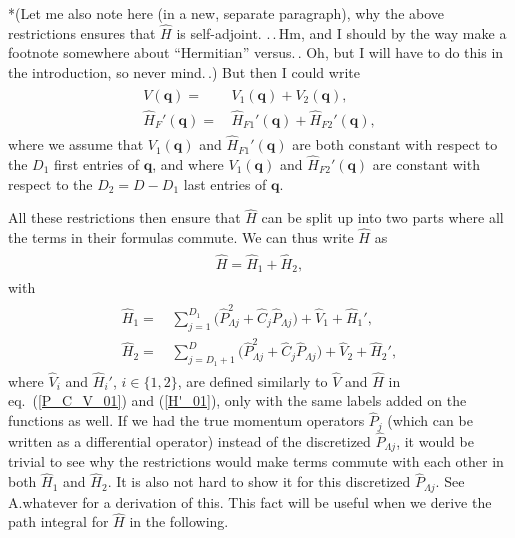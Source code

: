 \documentclass{report}
\begin{document}
*(Let me also note here (in a new, separate paragraph), why the above restrictions ensures that $\hat H$ is self-adjoint. .\,.\,Hm, and I should by the way make a footnote somewhere about ``Hermitian'' versus.\,. Oh, but I will have to do this in the introduction, so never mind.\,.)
But then I could write
\begin{align}
\begin{aligned}
	V(\boldsymbol{q}) =&\, V_1(\boldsymbol{q}) + V_2(\boldsymbol{q}), \\
	\hat H_F'(\boldsymbol{q}) =&\, \hat H_{F1}'(\boldsymbol{q}) + \hat H_{F2}'(\boldsymbol{q}),
\end{aligned}
\end{align}
where we assume that $V_1(\boldsymbol{q})$ and $\hat H_{F1}'(\boldsymbol{q})$ are both constant with respect to the $D_1$ first entries of $\boldsymbol{q}$, and where $V_1(\boldsymbol{q})$ and $\hat H_{F2}'(\boldsymbol{q})$ are constant with respect to the $D_2 = D - D_1$ last entries of $\boldsymbol{q}$. 

All these restrictions then ensure that $\hat H$ can be split up into two parts where all the terms in their formulas commute. We can thus write $\hat H$ as
\begin{align}
\begin{aligned}
	\hat H  = \hat H_1 + \hat H_2,
\end{aligned}
\end{align}
with
\begin{align}
\begin{aligned}
	\hat H_1  =&\,
		\sum_{j=1}^{D_1} \big( \hat P_{\Lambda j}^2 + \hat C_j \hat P_{\Lambda j} \big) + 
		\hat V_1 +
		\hat H_1', \\
	\hat H_2  =&\,
		\sum_{j=D_1 + 1}^{D} \big( \hat P_{\Lambda j}^2 + \hat C_j \hat P_{\Lambda j} \big) + 
		\hat V_2 +
		\hat H_2', 
	\label{H1_H2_01}
\end{aligned}
\end{align}
where $\hat V_i$ and $\hat H_i'$, $i\in\{1,2\}$, are %
defined similarly to $\hat V$ and $\hat H$ in eq.\ (\ref{P_C_V_01}) and (\ref{H'_01}), only with the same labels added on the functions as well. If we had the true momentum operators $\hat P_j$ (which can be written as a differential operator) instead of the discretized $\hat P_{\Lambda j}$, it would be trivial to see why the restrictions would make terms commute with each other in both $\hat H_1$ and $\hat H_2$. It is also not hard to show it for this discretized $\hat P_{\Lambda j}$. See A.whatever for a derivation of this. This fact will be useful when we derive the path integral for $\hat H$ in the following.
\end{document}
